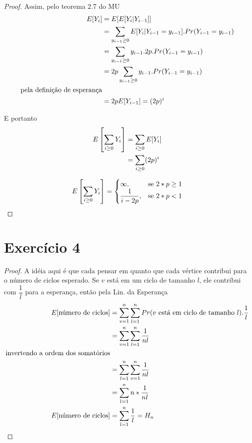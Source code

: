 \documentclass{article}
\begin{document}
\begin{proof}
	Assim, pelo teorema 2.7 do MU
	\begin{equation}
	\notag
		\begin{split}
			E[Y_i] &= E[E[Y_i|Y_{i-1}]]\\
			&= \sum\limits_{y_{i-1} \geq 0} E[Y_i | Y_{i-1} = y_{i-1}] . Pr(Y_{i-1} = y_{i-1})\\
			&= \sum\limits_{y_{i-1} \geq 0} y_{i-1}.2p . Pr(Y_{i-1} = y_{i-1})\\
			&= 2p \sum\limits_{y_{i-1} \geq 0} y_{i-1} . Pr(Y_{i-1} = y_{i-1})\\
			\text{pela definição de esperança}&\\
			&= 2p E[Y_{i-1}] = (2p)^i
		\end{split}
	\end{equation}

	E portanto
	\begin{equation}
	\notag
		\begin{split}
			E\left[\sum\limits_{i\geq0}Y_i\right] &= \sum\limits_{i\geq0}E[Y_i]\\
			&= \sum\limits_{i\geq0}(2p)^i
		\end{split}
	\end{equation}

	\begin{equation}
	\notag
		E\left[\sum\limits_{i\geq0}Y_i\right] =\begin{cases}
        \infty, & \text{se $2*p \geq 1$}\\
        \dfrac{1}{i-2p}, &\text{se $2*p < 1$}
    \end{cases}
	\end{equation}
\end{proof}

\section{Exercício 4}
\begin{proof}
	A idéia aqui é que cada pensar em quanto que cada vértice contribui para o
	número de ciclos esperado. Se $v$ está em um ciclo de tamanho $l$, ele 
	contribui com $\dfrac{1}{l}$ para a esperança, então pela Lin. da Esperança
	\begin{equation}
	\notag
		\begin{split}
			E[\text{número de ciclos}] &= \sum\limits_{v=1}^{n}\sum\limits_{l=1}^{n} Pr(v\text{ está em ciclo de tamanho }l).\dfrac{1}{l}\\
			&= \sum\limits_{v=1}^{n}\sum\limits_{l=1}^{n} \dfrac{1}{nl}\\
			\text{invertendo a ordem dos somatórios}&\\
			&= \sum\limits_{l=1}^{n}\sum\limits_{v=1}^{n} \dfrac{1}{nl}\\
			&= \sum\limits_{l=1}^{n} n * \dfrac{1}{nl} \\
			E[\text{número de ciclos}]&= \sum\limits_{l=1}^{n} \dfrac{1}{l} = H_n
		\end{split}
	\end{equation}
\end{proof}
\end{document}
